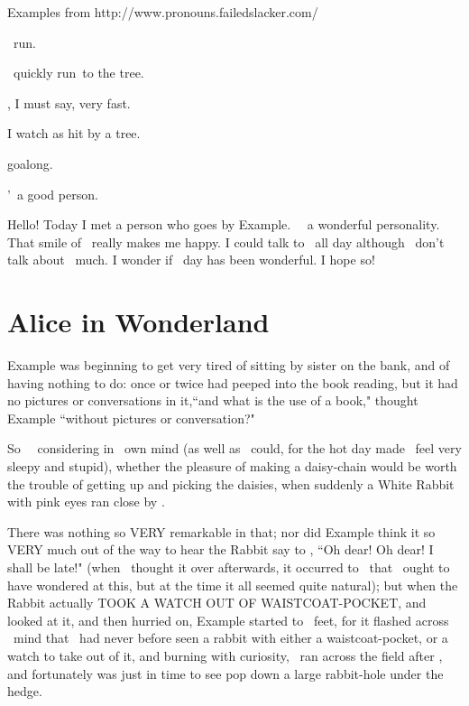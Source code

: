 \documentclass{article}
\begin{document}
Examples from http://www.pronouns.failedslacker.com/

\set

\They\ run\s.

\They\ quickly run\s\ to the tree.

\They[2] \were[2], I must say, very fast.

I watch as \they[2] \are[2] hit by a tree.

\They[3] go\es[3] along.

\They[4]'\re\ a good person.

Hello! Today I met a person who goes by Example. \They\ \have\ a wonderful personality. That smile of \theirs\ really makes me happy. I could talk to \them\ all day although \they\ do\es n't talk about \themself\ much. I wonder if \their\ day has been wonderful. I hope so!

\section{Alice in Wonderland}

\set
 Example was beginning to get very tired of sitting by \their[1] sister on the bank, and of having nothing to do: once or twice \they[1] had peeped into the book \they[2] \were[2] reading, but it had no pictures or conversations in it,``and what is the use of a book," thought Example ``without pictures or conversation?"

\set
So \they\ \were\ considering in \their\ own mind (as well as \they\ could, for the hot day made \them\ feel very sleepy and stupid), whether the pleasure of making a daisy-chain would be worth the trouble of getting up and picking the daisies, when suddenly a White Rabbit with pink eyes ran close by \them.

\set
There was nothing so VERY remarkable in that; nor did Example think it so VERY much out of the way to hear the Rabbit say to \themself[2], ``Oh dear! Oh dear! I shall be late!" (when \they\ thought it over afterwards, it occurred to \them\ that \they\ ought to have wondered at this, but at the time it all seemed quite natural); but when the Rabbit actually TOOK A WATCH OUT OF \their[2] WAISTCOAT-POCKET, and looked at it, and then hurried on, Example started to \their\ feet, for it flashed across \their\ mind that \they\ had never before seen a rabbit with either a waistcoat-pocket, or a watch to take out of it, and burning with curiosity, \they\ ran across the field after \them[2], and fortunately was just in time to see \them[2] pop down a large rabbit-hole under the hedge.
\end{document}
